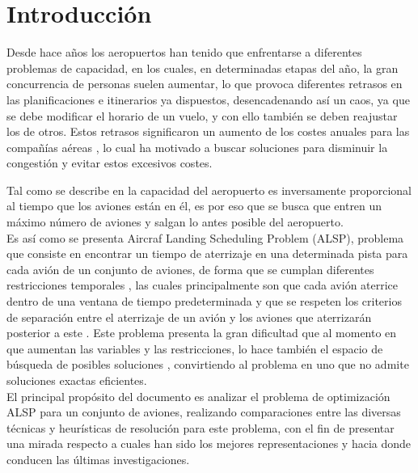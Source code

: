\documentclass[letter, 10pt]{article}
\begin{document}
\section{Introducción}

Desde hace años los aeropuertos han tenido que enfrentarse a diferentes problemas de capacidad, en los cuales, en determinadas etapas del año, la gran concurrencia de personas suelen aumentar, lo que provoca diferentes retrasos en las planificaciones e itinerarios ya dispuestos, desencadenando así un caos, ya que se debe modificar el horario de un vuelo, y con ello también se deben reajustar los de otros. Estos retrasos significaron un aumento de los costes anuales para las compañías aéreas \cite{REYNOLDSFEIGHAN1999113}, lo cual ha motivado a  buscar soluciones para disminuir la congestión y evitar estos excesivos costes.

Tal como se describe en \cite{REYNOLDSFEIGHAN1999113} la capacidad del aeropuerto es inversamente proporcional al tiempo que los aviones están en él, es por eso que se busca que entren un máximo número de aviones y salgan lo antes posible del aeropuerto.\\

Es así como se presenta Aircraf Landing Scheduling Problem (ALSP), problema que consiste en encontrar un tiempo de aterrizaje en una determinada pista para cada avión de un conjunto de aviones, de forma que se cumplan diferentes restricciones temporales \cite{article1}, las cuales principalmente son que cada avión aterrice dentro de una ventana de tiempo predeterminada y que se respeten los criterios de separación entre el aterrizaje de un avión y los aviones que aterrizarán posterior a este \cite{article2Europa}. Este problema presenta la gran dificultad que al momento en que aumentan las variables y las restricciones, lo hace también el espacio de búsqueda de posibles soluciones \cite{HybridAyudante}, convirtiendo al problema en uno que no admite soluciones exactas eficientes.\\

El principal propósito del documento es analizar el problema de optimización ALSP para un conjunto de aviones, realizando comparaciones entre las diversas técnicas y heurísticas de resolución para este problema, con el fin de presentar una mirada respecto a cuales han sido los mejores representaciones y hacia donde conducen las últimas investigaciones.  \\
\end{document}
